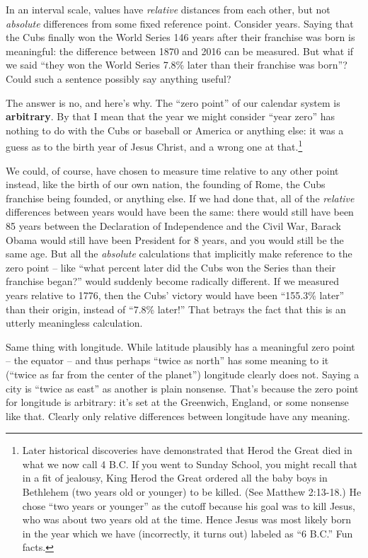 In an interval scale, values have \textit{relative} distances from each other,
but not \textit{absolute} differences from some fixed reference point. Consider
years. Saying that the Cubs finally won the World Series 146 years after their
franchise was born is meaningful: the difference between 1870 and 2016 can be
measured. But what if we said ``they won the World Series 7.8\% later than
their franchise was born''? Could such a sentence possibly say anything useful?

The answer is no, and here's why. The ``zero point'' of our calendar system is
\textbf{arbitrary}. By that I mean that the year we might consider ``year
zero'' has nothing to do with the Cubs or baseball or America or anything else:
it was a guess as to the birth year of Jesus Christ, and a wrong one at
that.\footnote{Later historical discoveries have demonstrated that Herod the
Great died in what we now call 4 B.C. If you went to Sunday School, you might
recall that in a fit of jealousy, King Herod the Great ordered all the baby
boys in Bethlehem (two years old or younger) to be killed. (See Matthew
2:13-18.) He chose ``two years or younger'' as the cutoff because his goal was
to kill Jesus, who was about two years old at the time. Hence Jesus was most
likely born in the year which we have (incorrectly, it turns out) labeled as
``6 B.C.'' Fun facts.}

We could, of course, have chosen to measure time relative to any other point
instead, like the birth of our own nation, the founding of Rome, the Cubs
franchise being founded, or anything else. If we had done that, all of the
\textit{relative} differences between years would have been the same: there
would still have been 85 years between the Declaration of Independence and the
Civil War, Barack Obama would still have been President for 8 years, and you
would still be the same age. But all the \textit{absolute} calculations that
implicitly make reference to the zero point -- like ``what percent later did
the Cubs won the Series than their franchise began?'' would suddenly become
radically different. If we measured years relative to 1776, then the Cubs'
victory would have been ``155.3\% later'' than their origin, instead of ``7.8\%
later!'' That betrays the fact that this is an utterly meaningless calculation.

Same thing with longitude. While latitude plausibly has a meaningful zero point
-- the equator -- and thus perhaps ``twice as north'' has some meaning to it
(``twice as far from the center of the planet'') longitude clearly does not.
Saying a city is ``twice as east'' as another is plain nonsense. That's because
the zero point for longitude is arbitrary: it's set at the Greenwich, England,
or some nonsense like that. Clearly only relative differences between longitude
have any meaning.

